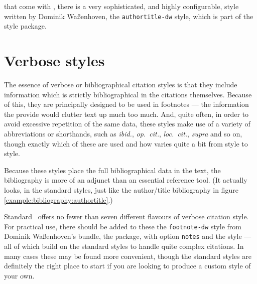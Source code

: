 that come with \biblatex,
there is a very sophisticated, and highly configurable, style written
by Dominik Waßenhoven, the \texttt{authortitle-dw} style, which is
part of the  style package.

\section{Verbose styles}

The essence of verbose or bibliographical citation styles is that they
include information which is strictly bibliographical in the citations
themselves. Because of this, they are principally designed to be used
in footnotes --- the information the provide would clutter text up
much too much. And, quite often, in order to avoid excessive
repetition of the same data, these styles make use of a variety of
abbreviations or shorthands, such as \emph{ibid.}, \emph{op.\ cit.},
\emph{loc.\ cit.}, \emph{supra} and so on, though exactly which of
these are used and how varies quite a bit from style to style.

Because these styles place the full bibliographical data in the text,
the bibliography is more of an adjunct than an essential reference
tool. (It actually looks, in the standard styles, just like the
author/title bibliography in figure
\ref{example:bibliography:authortitle}.)

Standard \biblatex\ offers no fewer than seven
different flavours of verbose citation style. For practical use, there
should be added to these the \verb|footnote-dw| style from Dominik
Waßenhoven's  bundle, the
 package, with option \verb|notes| and the
 style --- all of which build on the standard styles
to handle quite complex citations. In many cases these may be found
more convenient, though the standard styles are definitely the right
place to start if you are looking to produce a custom style of your
own.

